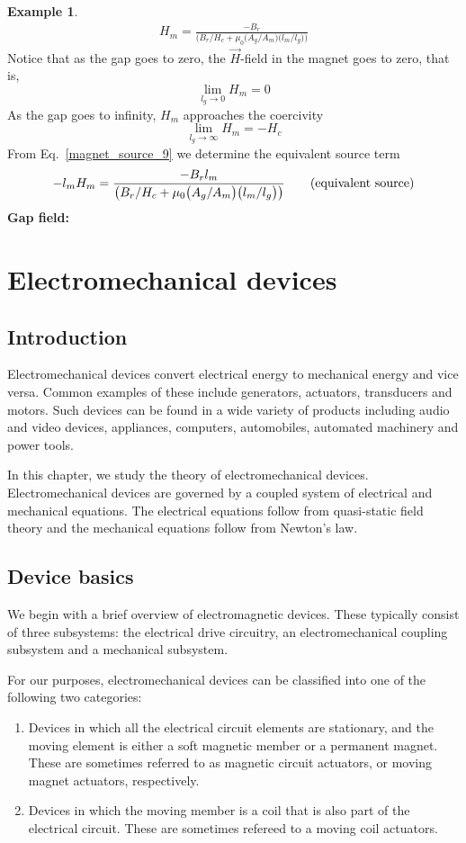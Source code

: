 \documentclass[11pt,a4paper,oneside]{book}
\numberwithin{equation}{section}
\theoremstyle{it}
\theoremstyle{definition}
\newtheorem{example}{Example}[section]
\begin{document}
\begin{example}
\begin{equation}
{\begin{aligned}
			H_m=\frac{-B_r}{\big(B_r/H_c+\mu_0\big(A_g/A_m\big)\big(l_m/l_g\big)\big)}
	\end{aligned}}
\end{equation}
Notice that as the gap goes to zero, the $\vec{H}$-field in the magnet goes to zero, that is, $$\lim\limits_{l_g\rightarrow0}H_m=0$$ As the gap goes to infinity, $H_m$ approaches the coercivity $$\lim\limits_{l_g\rightarrow\infty}H_m=-H_c$$ From Eq.~\eqref{magnet_source_9} we determine the equivalent source term
\begin{equation}\label{magnet_source_10}
	{\begin{aligned}
	-l_mH_m=\frac{-B_rl_m}{\big(B_r/H_c+\mu_0\big(A_g/A_m\big)\big(l_m/l_g\big)\big)} \qquad\text{\textnormal (equivalent source)}
	\end{aligned}}
\end{equation}
\textbf{Gap field:}
\end{example}




\chapter{Electromechanical devices}
\section{Introduction}
Electromechanical devices convert electrical energy to mechanical energy and vice versa. Common examples of these include generators, actuators, transducers and motors. Such devices can be found in a wide variety of products including audio and video devices, appliances, computers, automobiles, automated machinery and power tools.

In this chapter, we study the theory of electromechanical devices. Electromechanical devices are governed by a coupled system of electrical and mechanical equations. The electrical equations follow from quasi-static field theory and the mechanical equations follow from Newton's law.

\section{Device basics}
We begin with a brief overview of electromagnetic devices. These typically consist of three subsystems: the electrical drive circuitry, an electromechanical coupling subsystem and a mechanical subsystem.

For our purposes, electromechanical devices can be classified into one of the following two categories:
\begin{enumerate}
	\item Devices in which all the electrical circuit elements are stationary, and the moving element is either a soft magnetic member or a permanent magnet. These are sometimes referred to as magnetic circuit actuators, or moving magnet actuators, respectively.
	\item Devices in which the moving member is a coil that is also part of the electrical circuit. These are sometimes refereed to a moving coil actuators.
\end{enumerate}
\end{document}
